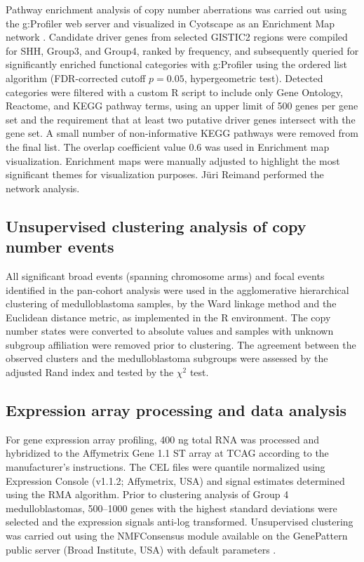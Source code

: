 Pathway enrichment analysis of copy number aberrations was carried out using the g:Profiler web server  and visualized in Cyotscape as an Enrichment Map network . Candidate driver genes from selected GISTIC2 regions were compiled for SHH, Group3, and Group4, ranked by frequency, and subsequently queried for significantly enriched functional categories with g:Profiler using the ordered list algorithm (FDR-corrected cutoff $p=0.05$, hypergeometric test). Detected categories were filtered with a custom R script to include only Gene Ontology, Reactome, and KEGG pathway terms, using an upper limit of 500 genes per gene set and the requirement that at least two putative driver genes intersect with the gene set. A small number of non-informative KEGG pathways were removed from the final list. The overlap coefficient value 0.6 was used in Enrichment map visualization.  Enrichment maps were manually adjusted to highlight the most significant themes for visualization purposes.  J\"{u}ri Reimand performed the network analysis.

\subsection{Unsupervised clustering analysis of copy number events}

All significant broad events (spanning chromosome arms) and focal events identified in the pan-cohort analysis were used in the agglomerative hierarchical clustering of medulloblastoma samples, by the Ward linkage method and the Euclidean distance metric, as implemented in the R environment. The copy number states were converted to absolute values and samples with unknown subgroup affiliation were removed prior to clustering. The agreement between the observed clusters and the medulloblastoma subgroups were assessed by the adjusted Rand index and tested by the $\chi^2$ test.

\subsection{Expression array processing and data analysis}

For gene expression array profiling, 400 ng total RNA was processed and hybridized to the Affymetrix Gene 1.1 ST array at TCAG according to the manufacturer’s instructions. The CEL files were quantile normalized using Expression Console (v1.1.2; Affymetrix, USA) and signal estimates determined using the RMA algorithm.  Prior to clustering analysis of Group 4 medulloblastomas, 500--1000 genes with the highest standard deviations were selected and the expression signals anti-log transformed. Unsupervised clustering was carried out using the NMFConsensus module available on the GenePattern public server (Broad Institute, USA) with default parameters .

